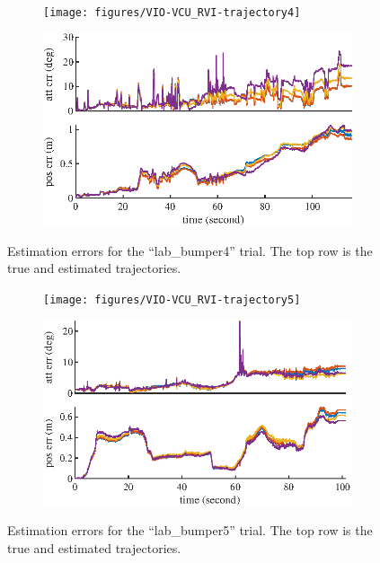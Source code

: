 \begin{figure}
	\centering
	\begin{subfigure}{\textwidth}
		\centering
		\texttt{[image: figures/VIO-VCU\_RVI-trajectory4]}
	\end{subfigure}
	\begin{subfigure}{\textwidth}
		\centering
		\vspace{1cm}
		\includegraphics[scale=1.3]{figures/VIO-VCU_RVI-error4}
	\end{subfigure}
	\caption[Estimation errors for the ``lab\_bumper4'' trial.]{Estimation errors for the ``lab\_bumper4'' trial. The top row is the true and estimated trajectories.}
	\label{fig:VIO-dataset4}
\end{figure}

\begin{figure}
	\centering
	\begin{subfigure}{\textwidth}
		\centering
		\texttt{[image: figures/VIO-VCU\_RVI-trajectory5]}
	\end{subfigure}
	\begin{subfigure}{\textwidth}
		\centering
		\vspace{1cm}
		\includegraphics[scale=1.3]{figures/VIO-VCU_RVI-error5}
	\end{subfigure}
	\caption[Estimation errors for the ``lab\_bumper5'' trial.]{Estimation errors for the ``lab\_bumper5'' trial. The top row is the true and estimated trajectories.}
	\label{fig:VIO-dataset5}
\end{figure}
